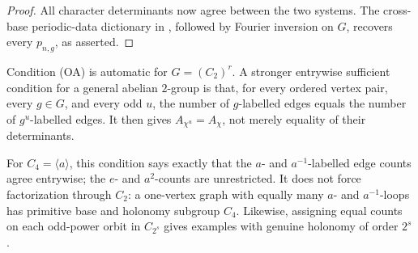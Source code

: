 \begin{proof}
All character determinants now agree between the two systems.  The
cross-base periodic-data dictionary in ,
followed by Fourier inversion on \(G\), recovers every
\(p_{n,g}\), as asserted.
\end{proof}

\begin{remark}
\label{rem:odd-adams-concrete-scope}
Condition (OA) is automatic for \(G=(C_2)^r\).  A stronger entrywise
sufficient condition for a general abelian \(2\)-group is that, for every
ordered vertex pair, every \(g\in G\), and every odd \(u\), the number of
\(g\)-labelled edges equals the number of \(g^u\)-labelled edges.  It then
gives \(A_{\chi^u}=A_\chi\), not merely equality of their determinants.

For \(C_4=\langle a\rangle\), this condition says exactly that the
\(a\)- and \(a^{-1}\)-labelled edge counts agree entrywise; the \(e\)- and
\(a^2\)-counts are unrestricted.  It does not force factorization through
\(C_2\): a one-vertex graph with equally many \(a\)- and \(a^{-1}\)-loops
has primitive base and holonomy subgroup \(C_4\).  Likewise, assigning equal
counts on each odd-power orbit in \(C_{2^s}\) gives examples with genuine
holonomy of order \(2^s\).
\end{remark}


